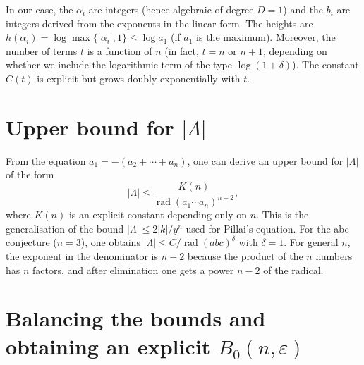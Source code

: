 \documentclass[11pt,a4paper]{article}
\begin{document}
In our case, the $\alpha_i$ are integers (hence algebraic of degree $D=1$) and the $b_i$ are integers derived from the exponents in the linear form. The heights are $h(\alpha_i) = \log \max\{|\alpha_i|,1\} \le \log a_1$ (if $a_1$ is the maximum). Moreover, the number of terms $t$ is a function of $n$ (in fact, $t = n$ or $n+1$, depending on whether we include the logarithmic term of the type $\log(1+\delta)$). The constant $C(t)$ is explicit but grows doubly exponentially with $t$.

\section{Upper bound for $|\Lambda|$}

From the equation $a_1 = -(a_2+\cdots+a_n)$, one can derive an upper bound for $|\Lambda|$ of the form
\[
|\Lambda| \le \frac{K(n)}{\operatorname{rad}(a_1\cdots a_n)^{n-2}},
\]
where $K(n)$ is an explicit constant depending only on $n$. This is the generalisation of the bound $|\Lambda| \le 2|k|/y^n$ used for Pillai's equation. For the abc conjecture ($n=3$), one obtains $|\Lambda| \le C / \operatorname{rad}(abc)^\delta$ with $\delta = 1$. For general $n$, the exponent in the denominator is $n-2$ because the product of the $n$ numbers has $n$ factors, and after elimination one gets a power $n-2$ of the radical.

\section{Balancing the bounds and obtaining an explicit $B_0(n,\varepsilon)$}
\end{document}
